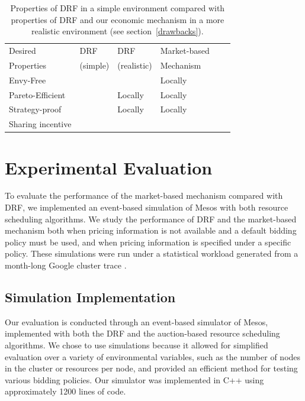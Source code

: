 \documentclass{acm_proc_article-sp}
\newcommand{\cmark}{\ding{51}}%
\begin{document}
\begin{table}[t!]
    \begin{tabular}{| l | l | l | l | l | l |}
    \hline
    Desired & \small DRF & \small DRF & \small Market-based  \\
    Properties & \small(simple) & \small (realistic) & \small Mechanism \\
    \hline
    \small Envy-Free & \cmark &  & Locally \\
    \small Pareto-Efficient & \cmark & Locally & Locally  \\
    \small Strategy-proof & \cmark & Locally  & Locally \\
    \small Sharing incentive & \cmark &  & \cmark\\
    \hline
    \end{tabular}
  \caption{Properties of DRF in a simple environment
 compared with properties of DRF and our economic mechanism
 in a more realistic environment (see section~\ref{drawbacks}).}
  \label{table:props}
\end{table}


\section{Experimental Evaluation}
\label{sec:eval}

To evaluate the performance of the market-based mechanism compared with DRF,
we implemented an event-based simulation of Mesos with both resource scheduling algorithms.
We study the performance of DRF and the market-based mechanism both when pricing information is not available and a default bidding policy must be used, and when pricing information is specified under a specific policy. These simulations were run under a statistical workload generated from a month-long Google cluster trace \cite{googlecluster}.
\vspace{-1mm}
\subsection{Simulation Implementation}
Our evaluation is conducted through an event-based simulator of Mesos, implemented with both the DRF and the auction-based resource scheduling algorithms. We chose to use simulations because it allowed for simplified evaluation over a variety of environmental variables, such as the number of nodes in the cluster or resources per node, and provided an efficient method for testing various bidding policies. Our simulator was implemented in C++ using approximately 1200 lines of code.
\end{document}
